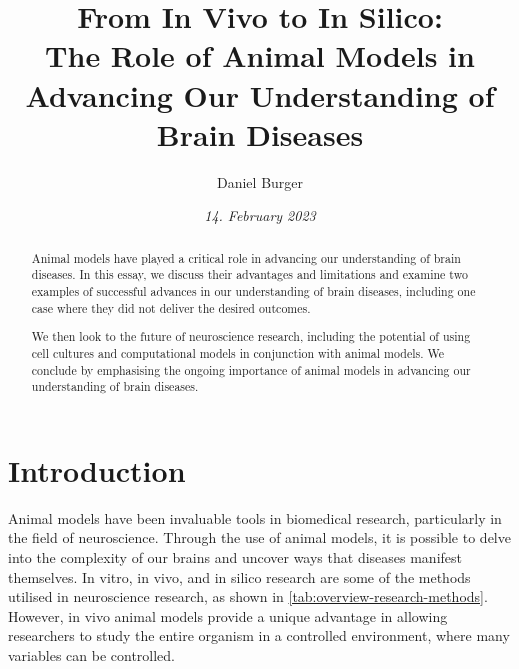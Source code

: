 \documentclass[10pt]{article}
\title{\textbf{From In Vivo to In Silico:} \\ The Role of Animal Models in Advancing Our Understanding of Brain Diseases}
\author[ ]{Daniel Burger}
\affil[ ]{\textbf{King's College London}}
\affil[ ]{\href{mailto:daniel.burger@kcl.ac.uk}{daniel.burger@kcl.ac.uk}}
\date{\textit{14. February 2023}}
\begin{document}

\maketitle
\thispagestyle{empty}

\begin{sloppypar} %
  \begin{abstract}
    Animal models have played a critical role in advancing our understanding of brain diseases. In this essay, we discuss their advantages and limitations and examine two examples of successful advances in our understanding of brain diseases, including one case where they did not deliver the desired outcomes.

    We then look to the future of neuroscience research, including the potential of using cell cultures and computational models in conjunction with animal models. We conclude by emphasising the ongoing importance of animal models in advancing our understanding of brain diseases.

  \end{abstract}
  \pagebreak

  \tableofcontents
  \pagebreak

  \listoffigures
  \listoftables
  \pagebreak


  \doublespacing

  \section{Introduction}
  \label{sec:introduction}

  Animal models have been invaluable tools in biomedical research, particularly in the field of neuroscience. Through the use of animal models, it is possible to delve into the complexity of our brains and uncover ways that diseases manifest themselves. In vitro, in vivo, and in silico research are some of the methods utilised in neuroscience research, as shown in \autoref{tab:overview-research-methods}. However, in vivo animal models provide a unique advantage in allowing researchers to study the entire organism in a controlled environment, where many variables can be controlled.


\end{sloppypar}
\end{document}
